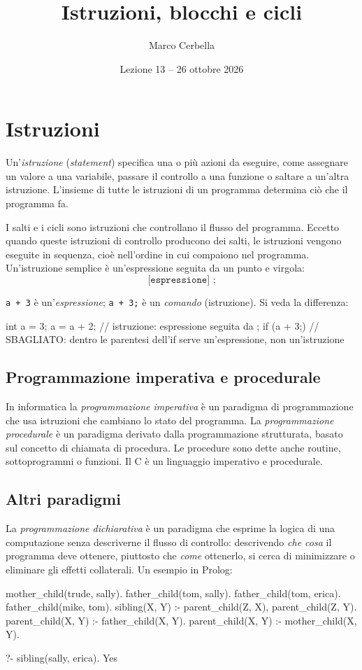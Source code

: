 \documentclass[11pt,a4paper]{article}
\title{Istruzioni, blocchi e cicli}
\author{Marco Cerbella}
\date{Lezione 13 -- 26 ottobre 2026}
\begin{document}
\maketitle

\section{Istruzioni}

Un'\emph{istruzione} (\emph{statement}) specifica una o più azioni da eseguire, come assegnare un valore a una variabile, passare il controllo a una funzione o saltare a un'altra istruzione. L'insieme di tutte le istruzioni di un programma determina ciò che il programma fa.

I salti e i cicli sono istruzioni che controllano il flusso del programma. Eccetto quando queste istruzioni di controllo producono dei salti, le istruzioni vengono eseguite in sequenza, cioè nell'ordine in cui compaiono nel programma. Un'istruzione semplice è un'espressione seguita da un punto e virgola:
\[
\texttt{[espressione] ;}
\]

\begin{esempio}
\lstinline|a + 3| è un'\emph{espressione}; \lstinline|a + 3;| è un \emph{comando} (istruzione). Si veda la differenza:
\begin{codice}
int a = 3;
a = a + 2;        // istruzione: espressione seguita da ;
if (a + 3;) { }   // SBAGLIATO: dentro le parentesi dell'if serve un'espressione, non un'istruzione
\end{codice}
\end{esempio}

\subsection{Programmazione imperativa e procedurale}

In informatica la \emph{programmazione imperativa} è un paradigma di programmazione che usa istruzioni che cambiano lo stato del programma. La \emph{programmazione procedurale} è un paradigma derivato dalla programmazione strutturata, basato sul concetto di chiamata di procedura. Le procedure sono dette anche routine, sottoprogrammi o funzioni. Il C è un linguaggio imperativo e procedurale.

\subsection{Altri paradigmi}

La \emph{programmazione dichiarativa} è un paradigma che esprime la logica di una computazione senza descriverne il flusso di controllo: descrivendo \emph{che cosa} il programma deve ottenere, piuttosto che \emph{come} ottenerlo, si cerca di minimizzare o eliminare gli effetti collaterali. Un esempio in Prolog:
\begin{codice}
mother_child(trude, sally).
father_child(tom, sally).
father_child(tom, erica).
father_child(mike, tom).
sibling(X, Y) :- parent_child(Z, X), parent_child(Z, Y).
parent_child(X, Y) :- father_child(X, Y).
parent_child(X, Y) :- mother_child(X, Y).

?- sibling(sally, erica).
Yes
\end{codice}
\end{document}
